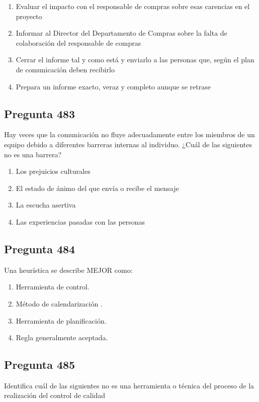 \documentclass[11pt,a4paper]{article}
\begin{document}
\begin{enumerate}[label=\alph*)]
  \item Evaluar el impacto con el responsable de compras sobre esas carencias en el proyecto
  \item Informar al Director del Departamento de Compras sobre la falta de colaboración del responsable de compras
  \item Cerrar el informe tal y como está y enviarlo a las personas que, según el plan de comunicación deben recibirlo
  \item Prepara un informe exacto, veraz y completo aunque se retrase
\end{enumerate}

\subsection*{Pregunta 483}
Hay veces que la comunicación no fluye adecuadamente entre los miembros de un equipo debido a diferentes barreras internas al individuo. ¿Cuál de las siguientes no es una barrera?

\begin{enumerate}[label=\alph*)]
  \item Los prejuicios culturales
  \item El estado de ánimo del que envía o recibe el mensaje
  \item La escucha asertiva
  \item Las experiencias pasadas con las personas
\end{enumerate}

\subsection*{Pregunta 484}
Una heurística se describe MEJOR como:

\begin{enumerate}[label=\alph*)]
  \item Herramienta de control.
  \item Método de calendarización .
  \item Herramienta de planificación.
  \item Regla generalmente aceptada.
\end{enumerate}

\subsection*{Pregunta 485}
Identifica cuál de las siguientes no es una herramienta o técnica del proceso de la realización del control de calidad
\end{document}
